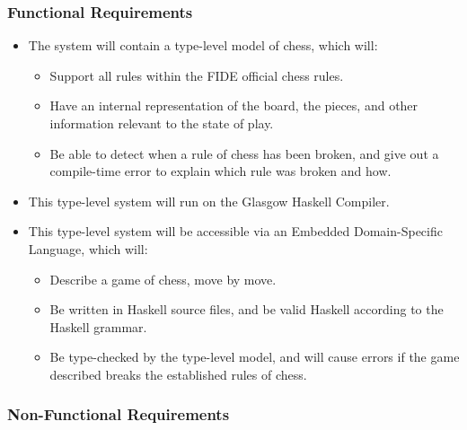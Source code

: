 \documentclass[12pt, a4paper]{scrartcl}
\begin{document}
\subsubsection{Functional Requirements}

\begin{itemize}
    \item The system will contain a type-level model of chess, which will:
          \begin{itemize}
              \item Support all rules within the FIDE official chess rules.
              \item Have an internal representation of the board, the pieces, and other information relevant to the state of play.
              \item Be able to detect when a rule of chess has been broken, and give out a compile-time error to explain which rule was broken and how.
          \end{itemize}
    \item This type-level system will run on the Glasgow Haskell Compiler.
    \item This type-level system will be accessible via an Embedded Domain-Specific Language, which will:
          \begin{itemize}
              \item Describe a game of chess, move by move.
              \item Be written in Haskell source files, and be valid Haskell according to the Haskell grammar.
              \item Be type-checked by the type-level model, and will cause errors if the game described breaks the established rules of chess.
          \end{itemize}
\end{itemize}

\subsubsection{Non-Functional Requirements}
\end{document}
